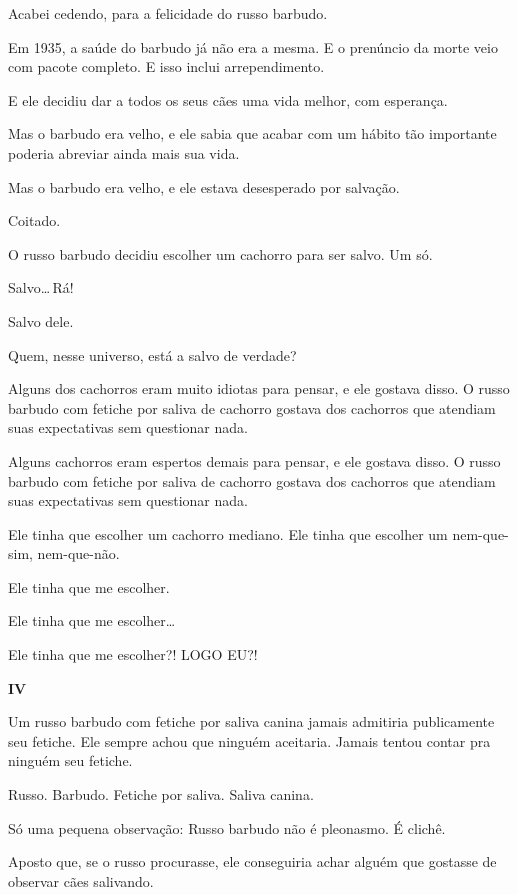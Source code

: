 \enlargethispage{\baselineskip}

Acabei cedendo, para a felicidade do russo barbudo.

Em 1935, a saúde do barbudo já não era a mesma. E o prenúncio da morte veio com pacote completo. E isso inclui arrependimento.

E ele decidiu dar a todos os seus cães uma vida melhor, com esperança.

Mas o barbudo era velho, e ele sabia que acabar com um hábito tão importante poderia abreviar ainda mais sua vida.

Mas o barbudo era velho, e ele estava desesperado por salvação.

Coitado.

O russo barbudo decidiu escolher um cachorro para ser salvo. Um só.

Salvo\ldots\,Rá!

Salvo dele.

Quem, nesse universo, está a salvo de verdade?

Alguns dos cachorros eram muito idiotas para pensar, e ele gostava disso. O russo barbudo com fetiche por saliva de cachorro gostava dos cachorros que atendiam suas expectativas sem questionar nada.

Alguns cachorros eram espertos demais para pensar, e ele gostava disso. O russo barbudo com fetiche por saliva de cachorro gostava dos cachorros que atendiam suas expectativas sem questionar nada.

Ele tinha que escolher um cachorro mediano. Ele tinha que escolher um nem-que-sim, nem-que-não.

Ele tinha que me escolher.

Ele tinha que me escolher\ldots

Ele tinha que me escolher?! LOGO EU?!

\newpage
\begin{center}
{\Large \textbf{IV}}
\end{center}

Um russo barbudo com fetiche por saliva canina jamais admitiria publicamente seu fetiche. Ele sempre achou que ninguém aceitaria. Jamais tentou contar pra ninguém seu fetiche.

Russo. Barbudo. Fetiche por saliva. Saliva canina.

Só uma pequena observação: Russo barbudo não é pleonasmo. É clichê.

Aposto que, se o russo procurasse, ele conseguiria achar alguém que gostasse de observar cães salivando.

